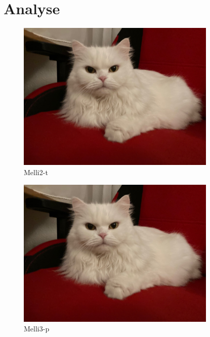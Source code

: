 \documentclass[12pt,ngerman,parskip=full]{scrreprt}
\begin{document}
\blindtext[2]

\blindtext[2]

\chapter{Analyse}

\blindtext[5]

\begin{figure}[t]\centering
\includegraphics[width=0.85\textwidth]{Images/Katze}
\caption{Melli2-t}
\end{figure}

\blindtext[3]

\blindtext[2]

\begin{figure}[p]\centering
\includegraphics[width=0.85\textwidth]{Images/Katze}
\caption{Melli3-p}
\end{figure}

\blindtext[3]
\end{document}
